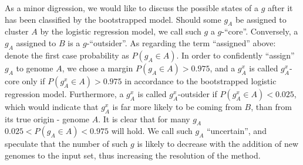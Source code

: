 As a minor digression, we would like to discuss the possible states of a $g$
after it has been classified by the bootstrapped model. Should some $g_A$ be
assigned to cluster $A$ by the logistic regression model, we call such $g$ a
$g$-``core''. Conversely, a $g_A$ assigned to $B$ is a $g$-``outsider''. As
regarding the term ``assigned'' above: denote the first case probability as
$P(g_A \in A)$. In order to confidently ``assign'' $g_A$ to genome $A$, we
chose a margin $P(g_A \in A) >0.975$, and a $g_A^x$ is called $g_A^x$-core only
if $P(g_A^x \in A) > 0.975$ in accordance to the bootstrapped logistic
regression model.  Furthermore, a $g_A^x$ is called $g_A^x$-outsider if
$P(g_A^x \in A) < 0.025$, which would indicate that $g_A^x$ is far more likely
to be coming from $B$, than from its true origin - genome $A$. It is clear that
for many $g_A$ $0.025 < P(g_A \in A) < 0.975$ will hold. We call such $g_A$
``uncertain'', and speculate that the number of such $g$ is likely to decrease
with the addition of new genomes to the input set, thus increasing the
resolution of the method.
